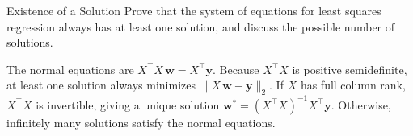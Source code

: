 \documentclass{article}
\begin{document}
\begin{exercise}{Existence of a Solution}
  Prove that the system of equations for least squares regression always has at least one solution, and discuss the possible number of solutions.
  
  \begin{solution}
    The normal equations are $X^\top X\,\mathbf{w} = X^\top \mathbf{y}.$ 
    Because $X^\top X$ is positive semidefinite, at least one solution always minimizes $\|X\,\mathbf{w} - \mathbf{y}\|_2.$ 
    If $X$ has full column rank, $X^\top X$ is invertible, giving a unique solution 
    $\mathbf{w}^* = (X^\top X)^{-1} X^\top \mathbf{y}.$ 
    Otherwise, infinitely many solutions satisfy the normal equations.
  \end{solution}
\end{exercise}



\end{document}
